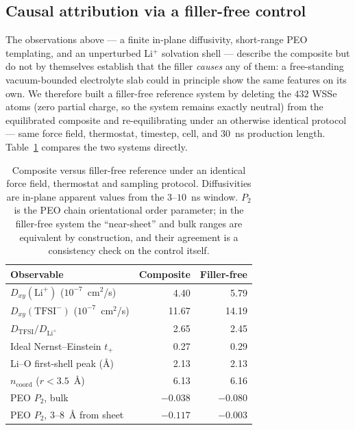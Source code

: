 \documentclass[review, 12pt]{elsarticle}
\numberwithin{equation}{section}
\newcommand{\Tab}[1] {Table~\ref{#1}}
\newcommand{\DLi}{D_{\mathrm{Li}^+}}
\newcommand{\Dxy}{D_{xy}}
\begin{document}
\subsection{Causal attribution via a filler-free control}\label{sec:res_control}
The observations above --- a finite in-plane diffusivity, short-range PEO templating, and an unperturbed Li$^+$ solvation shell --- describe the composite but do not by themselves establish that the filler \emph{causes} any of them: a free-standing vacuum-bounded electrolyte slab could in principle show the same features on its own. We therefore built a filler-free reference system by deleting the $432$ WSSe atoms (zero partial charge, so the system remains exactly neutral) from the equilibrated composite and re-equilibrating under an otherwise identical protocol --- same force field, thermostat, timestep, cell, and $30$~ns production length. \Tab{tab:control} compares the two systems directly.

\begin{table}[H]
\caption{Composite versus filler-free reference under an identical force
field, thermostat and sampling protocol. Diffusivities are in-plane
apparent values from the $3$--$10$~ns window. $P_2$ is the PEO chain
orientational order parameter; in the filler-free system the ``near-sheet''
and bulk ranges are equivalent by construction, and their agreement is a
consistency check on the control itself.}
\label{tab:control}
\centering
\begin{tabular}{lrr}
\hline
Observable & Composite & Filler-free \\
\hline
$\Dxy(\mathrm{Li}^+)$ ($10^{-7}$~cm$^2$/s) & 4.40 & 5.79 \\
$D_{xy}(\mathrm{TFSI}^-)$ ($10^{-7}$~cm$^2$/s) & 11.67 & 14.19 \\
$D_{\mathrm{TFSI}}/\DLi$ & 2.65 & 2.45 \\
Ideal Nernst--Einstein $t_+$ & 0.27 & 0.29 \\
Li--O first-shell peak (\AA) & 2.13 & 2.13 \\
$n_{\mathrm{coord}}$ ($r<3.5$~\AA) & 6.13 & 6.16 \\
PEO $P_2$, bulk & $-0.038$ & $-0.080$ \\
PEO $P_2$, $3$--$8$~\AA{} from sheet & $-0.117$ & $-0.003$ \\
\hline
\end{tabular}
\end{table}
\end{document}
